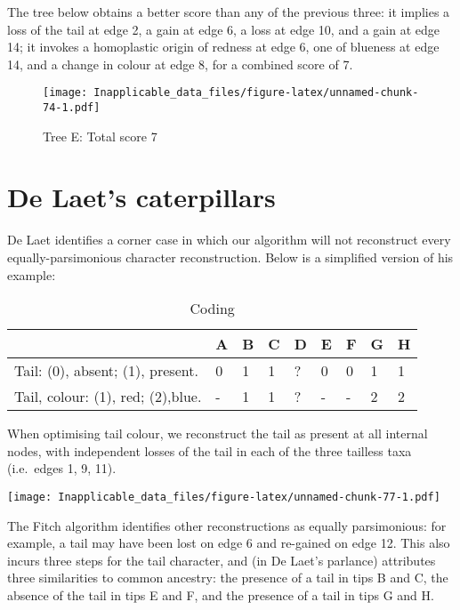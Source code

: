 \documentclass[]{book}
\theoremstyle{definition}
\theoremstyle{definition}
\theoremstyle{definition}
\theoremstyle{remark}
\begin{document}
The tree below obtains a better score than any of the previous three: it
implies a loss of the tail at edge 2, a gain at edge 6, a loss at edge
10, and a gain at edge 14; it invokes a homoplastic origin of redness at
edge 6, one of blueness at edge 14, and a change in colour at edge 8,
for a combined score of 7.

\begin{figure}
\centering
\texttt{[image: Inapplicable\_data\_files/figure-latex/unnamed-chunk-74-1.pdf]}
\caption{\label{fig:unnamed-chunk-74}Tree E: Total score 7}
\end{figure}

\hypertarget{de-laets-caterpillars}{%
\section{De Laet's caterpillars}\label{de-laets-caterpillars}}

De Laet \citeyearpar{DeLaet2017} identifies a corner case in which our
algorithm \citep{Brazeau2018} will not reconstruct every
equally-parsimonious character reconstruction. Below is a simplified
version of his example:

\begin{table}

\caption{\label{tab:unnamed-chunk-76}Coding}
\centering
\begin{tabular}[t]{l|l|l|l|l|l|l|l|l}
\hline
  & A & B & C & D & E & F & G & H\\
\hline
Tail: (0), absent; (1), present. & 0 & 1 & 1 & ? & 0 & 0 & 1 & 1\\
\hline
Tail, colour: (1), red; (2),blue. & - & 1 & 1 & ? & - & - & 2 & 2\\
\hline
\end{tabular}
\end{table}

When optimising tail colour, we reconstruct the tail as present at all
internal nodes, with independent losses of the tail in each of the three
tailless taxa (i.e.~edges 1, 9, 11).

\texttt{[image: Inapplicable\_data\_files/figure-latex/unnamed-chunk-77-1.pdf]}

The Fitch algorithm identifies other reconstructions as equally
parsimonious: for example, a tail may have been lost on edge 6 and
re-gained on edge 12. This also incurs three steps for the tail
character, and (in De Laet's parlance) attributes three similarities to
common ancestry: the presence of a tail in tips B and C, the absence of
the tail in tips E and F, and the presence of a tail in tips G and H.
\end{document}
